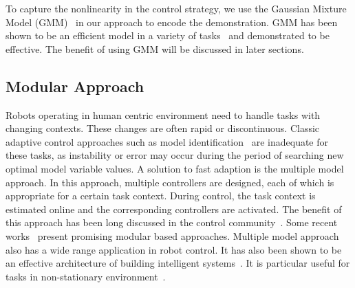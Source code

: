 To capture the nonlinearity in the control strategy, we use the Gaussian Mixture Model (GMM)~\cite{cohn1996active} in our approach to encode the demonstration. GMM has been shown to be an efficient model in a variety of tasks~\cite{huang2013learning,sauser2011iterative,calinon2007incremental} and demonstrated to be effective. The benefit of using GMM will be discussed in later sections.

\subsection{Modular Approach}



Robots operating in human centric environment need to handle tasks with changing contexts. These changes are often rapid or discontinuous. Classic adaptive control approaches such as model identification~\cite{khalil2004modeling} are inadequate for these tasks, as instability or error may occur during the period of searching new optimal model variable values. A solution to fast adaption is the multiple model approach. In this approach, multiple controllers are designed, each of which is appropriate for a certain task context. During control, the task context is estimated online and the corresponding controllers are activated. The benefit of this approach has been long discussed in the control community~\cite{jacobs1991adaptive,narendra1995adaptation,narendra1997adaptive}. Some recent works~\cite{fekri2007robust,kuipers2010multiple} present promising modular based approaches. Multiple model approach also has a wide range application in robot control. It has also been shown to be an effective architecture of building intelligent systems~\cite{bryson2004modular,BrysonMcG12}. It is particular useful for tasks in  non-stationary environment~\cite{petkos2006learning,sugimoto2012emosaic}.

